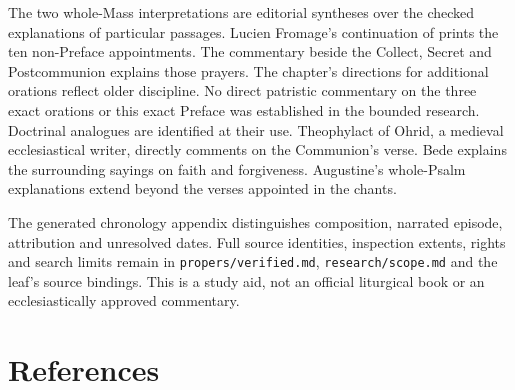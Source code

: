 The two whole-Mass interpretations are editorial syntheses over the
checked explanations of particular passages. Lucien Fromage's continuation
of  prints the ten non-Preface appointments.
The commentary beside the Collect, Secret and Postcommunion
explains those prayers. The chapter's directions for additional
orations reflect older discipline. No direct patristic commentary on
the three exact orations or this exact Preface was established in the
bounded research.
Doctrinal analogues are identified at their use. Theophylact of Ohrid,
a medieval ecclesiastical writer, directly comments on the Communion's
verse. Bede explains the surrounding sayings on faith and forgiveness.
Augustine's whole-Psalm explanations extend beyond the verses appointed
in the chants.

The generated chronology appendix distinguishes composition, narrated
episode, attribution and unresolved dates. Full source identities,
inspection extents, rights and search limits remain in
\texttt{propers/verified.md}, \texttt{research/scope.md} and the
leaf's source bindings. This is a study aid, not an official liturgical
book or an ecclesiastically approved commentary.

\section{References}


